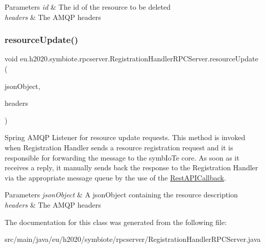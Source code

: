 \begin{DoxyParams}{Parameters}
{\em id} & The id of the resource to be deleted \\
\hline
{\em headers} & The A\+M\+QP headers \\
\hline
\end{DoxyParams}
\mbox{\label{classeu_1_1h2020_1_1symbiote_1_1rpcserver_1_1RegistrationHandlerRPCServer_add97d8f15845030d4f09f7db65107bec}} 
\subsubsection{\texorpdfstring{resource\+Update()}{resourceUpdate()}}
{\footnotesize\ttfamily void eu.\+h2020.\+symbiote.\+rpcserver.\+Registration\+Handler\+R\+P\+C\+Server.\+resource\+Update (\begin{DoxyParamCaption}\item[{J\+S\+O\+N\+Object}]{json\+Object,  }\item[{@Headers() Map$<$ String, String $>$}]{headers }\end{DoxyParamCaption})}

Spring A\+M\+QP Listener for resource update requests. This method is invoked when Registration Handler sends a resource registration request and it is responsible for forwarding the message to the symb\+Io\+Te core. As soon as it receives a reply, it manually sends back the response to the Registration Handler via the appropriate message queue by the use of the \hyperlink{classeu_1_1h2020_1_1symbiote_1_1rpcserver_1_1RestAPICallback}{Rest\+A\+P\+I\+Callback}.


\begin{DoxyParams}{Parameters}
{\em json\+Object} & A json\+Object containing the resource description \\
\hline
{\em headers} & The A\+M\+QP headers \\
\hline
\end{DoxyParams}


The documentation for this class was generated from the following file\+:\begin{DoxyCompactItemize}
\item 
src/main/java/eu/h2020/symbiote/rpcserver/Registration\+Handler\+R\+P\+C\+Server.\+java\end{DoxyCompactItemize}
